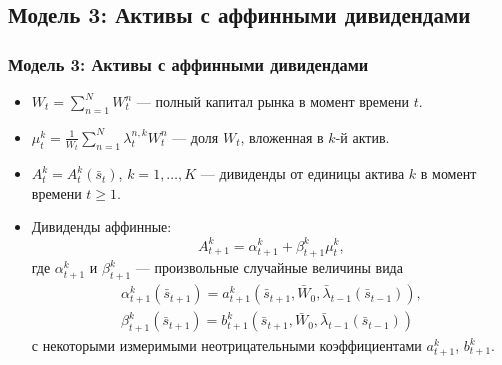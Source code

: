 \documentclass[aspectratio=169]{beamer}
\theoremstyle{definition}
\theoremstyle{remark}
\begin{document}
\subsection{Модель 3: Активы с аффинными дивидендами}
\begin{frame}\frametitle{Модель 3: Активы с аффинными дивидендами}
    \begin{itemize}
    \item $W_t = \sum_{n=1}^N W_t^n$ — полный капитал рынка в момент времени $t$.
    \item $\mu_{t}^k = \frac{1}{W_t}\sum_{n=1}^{N}\lambda_{t}^{n,k} W_t^n$ — доля $W_t$, вложенная в $k$-й актив.
    \item $A_{t}^k = A_{t}^k(  \bar s_{t} )$, $k=1,\dots,K$ — дивиденды от единицы актива $k$ в момент времени $t\ge 1$.
   
    \item Дивиденды аффинные:
    $$
    \label{6-A-t-k-affine}
    A_{t+1}^k = \alpha_{t+1}^k + \beta_{t+1}^k \mu_{t}^k,
    $$
    где $\alpha_{t+1}^k$ и $\beta_{t+1}^k$ — произвольные случайные величины вида
    \begin{gather}
    \label{7-alpha-t-k}
    \alpha_{t+1}^k( \bar s_{t+1}) = a_{t+1}^k( \bar s_{t+1}, \bar W_0, \bar \lambda_{t-1}( \bar s_{t-1} )), \\
    \label{8-beta-t-k}
    \beta_{t+1}^k( \bar s_{t+1} ) = b_{t+1}^k ( \bar s_{t+1},\bar W_0, \bar\lambda_{t-1}( \bar s_{t-1} ))
    \end{gather}
    с некоторыми измеримыми неотрицательными коэффициентами $a_{t+1}^k$, $b_{t+1}^k$.
    \end{itemize}
\end{frame}
\end{document}
